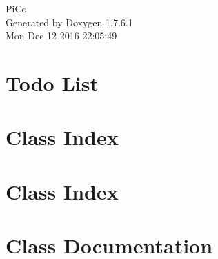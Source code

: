 \documentclass[a4paper]{book}
\begin{document}
\hypersetup{pageanchor=false,citecolor=blue}
\begin{titlepage}
\vspace*{7cm}
\begin{center}
{\Large \-Pi\-Co }\\
\vspace*{1cm}
{\large \-Generated by Doxygen 1.7.6.1}\\
\vspace*{0.5cm}
{\small Mon Dec 12 2016 22:05:49}\\
\end{center}
\end{titlepage}
\clearemptydoublepage
{}
\tableofcontents
\clearemptydoublepage
{}
\hypersetup{pageanchor=true,citecolor=blue}
\chapter{\-Todo \-List}
\label{todo}
\hypertarget{todo}{}

\chapter{\-Class \-Index}

\chapter{\-Class \-Index}

\chapter{\-Class \-Documentation}




































\printindex
\end{document}

